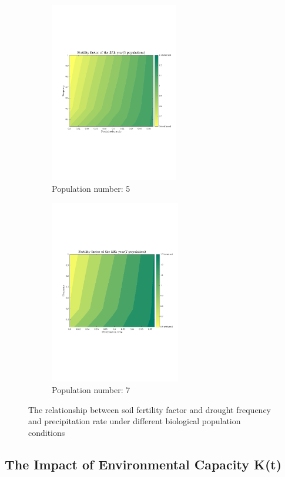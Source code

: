 \documentclass{mcmthesis}
\begin{document}
\begin{figure}
  \hspace{1.1cm}
  \begin{subfigure}{0.4\textwidth}
    \includegraphics[width=5.6cm]{img/Contour_5.pdf}
    \caption{Population number: 5$\quad\quad\quad$}
    \label{fig:subfigure3}
  \end{subfigure}
  \hspace{0cm}
  \begin{subfigure}{0.4\textwidth}
    \includegraphics[width=5.7cm]{img/Contour_7.pdf}
    \caption{Population number: 7$\quad\quad\quad$}
    \label{fig:subfigure4}
  \end{subfigure}
  \caption{The relationship between soil fertility factor and drought frequency and precipitation rate under different biological population conditions}
  \label{fig:Contours}
\end{figure}




\subsection{The Impact of Environmental Capacity K(t)}
\end{document}
